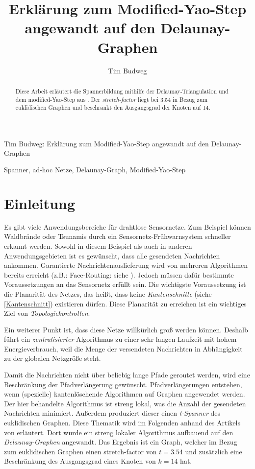 \documentclass[a4paper,twoside]{IEEEtran}
\newcommand{\seminarteilnehmer}{Tim Budweg}
\newcommand{\seminartitel}{Erklärung zum Modified-Yao-Step angewandt auf den Delaunay-Graphen}
\begin{document}
\title{\seminartitel}
\author{\seminarteilnehmer}

%
{\seminarteilnehmer: \seminartitel}


\maketitle

\begin{abstract}
\space Diese Arbeit erläutert die Spannerbildung mithilfe der Delaunay-Triangulation und dem modified-Yao-Step aus \cite{kanj}. Der \emph{stretch-factor} liegt bei 3.54 in Bezug zum euklidischen Graphen und beschränkt den Ausgangsgrad der Knoten auf 14.
\end{abstract}

\begin{IEEEkeywords}
\space Spanner, ad-hoc Netze, Delaunay-Graph, Modified-Yao-Step
\end{IEEEkeywords}


\section{Einleitung}
Es gibt viele Anwendungsbereiche für drahtlose Sensornetze. 
Zum Beispiel können Waldbrände oder Tsunamis durch ein Sensornetz-Frühwarnsystem schneller erkannt werden. 
Sowohl in diesem Beispiel als auch in anderen Anwendungsgebieten ist es gewünscht, dass alle gesendeten Nachrichten ankommen.
Garantierte Nachrichtenauslieferung wird von mehreren Algorithmen bereits erreicht (z.B.: Face-Routing: siehe \cite{FaceRouting}).
Jedoch müssen dafür bestimmte Voraussetzungen an das Sensornetz erfüllt sein. 
Die wichtigste Voraussetzung ist die Planarität des Netzes, das heißt, dass keine \emph{Kantenschnitte} (siehe \ref{Kantenschnitt}) existieren dürfen. 
Diese Planarität zu erreichen ist ein wichtiges Ziel von \emph{Topologiekontrollen}.

Ein weiterer Punkt ist, dass diese Netze willkürlich groß werden können.
Deshalb führt ein \emph{zentralisierter} Algorithmus zu einer sehr langen Laufzeit mit hohem Energieverbrauch, weil die Menge der versendeten Nachrichten in Abhängigkeit zu der globalen Netzgröße steht.

Damit die Nachrichten nicht über beliebig lange Pfade geroutet werden, wird eine Beschränkung der Pfadverlängerung gewünscht. 
Pfadverlängerungen entstehen, wenn (spezielle) kantenlöschende Algorithmen auf Graphen angewendet werden.
Der hier behandelte Algorithmus ist streng lokal, was die Anzahl der gesendeten Nachrichten minimiert.
Außerdem produziert dieser einen \emph{t-Spanner} des euklidischen Graphen.
Diese Thematik wird im Folgenden anhand des Artikels von \cite{kanj} erläutert.
Dort wurde ein streng lokaler Algorithmus aufbauend auf den \emph{Delaunay-Graphen} angewandt.
Das Ergebnis ist ein Graph, welcher im Bezug zum euklidischen Graphen einen stretch-factor von $t=3.54 $ und zusätzlich eine Beschränkung des Ausgangsgrad eines Knoten von $k=14 $ hat.
\end{document}
